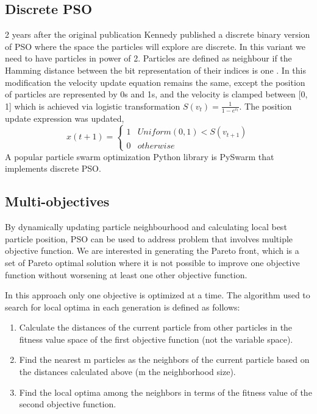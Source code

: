 \documentclass{article}
\begin{document}
\subsection{Discrete PSO}
2 years after the original publication Kennedy \cite{kennedy1997discrete} published a discrete binary version of PSO where the space the particles will explore are discrete. In this variant we need to have particles in power of 2. Particles are defined as neighbour if the Hamming distance between the bit representation of their indices is one \cite{abdelbar2003swarm}. In this modification the velocity update equation remains the same, except the position of particles are represented by 0s and 1s, and the velocity is clamped between [0, 1] which is achieved via logistic transformation $S(v_t) = \frac{1}{1 - e^{v_t}}$. The position update expression was updated,
\begin{equation}
x(t+1) = 
\begin{cases} 
1 & Uniform(0,1) < S(v_{t+1}) \\ 
0 & otherwise 
\end{cases}
\end{equation}
A popular particle swarm optimization Python library is PySwarm that implements discrete PSO.\cite{pyswarms.discrete}

\subsection{Multi-objectives}
 
By dynamically updating particle neighbourhood and calculating local best particle position, PSO can be used to address problem that involves multiple objective function. We are interested in generating the Pareto front, which is a set of Pareto optimal solution where it is not possible to improve one objective function without worsening at least one other objective function.

In this approach only one objective is optimized at a time. The algorithm used to search for local optima in each generation
is defined as follows:
\begin{enumerate}
    \item Calculate the distances of the current particle from other particles in the fitness value space of the first objective function (not the variable space).

    \item Find the nearest m particles as the neighbors of the current particle based on the distances calculated above (m the neighborhood size).

    \item Find the local optima among the neighbors in terms of the fitness value of the second objective function.
\end{enumerate}
\end{document}
